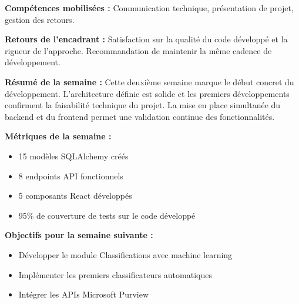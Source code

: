 \textbf{Compétences mobilisées :}
Communication technique, présentation de projet, gestion des retours.

\textbf{Retours de l'encadrant :}
Satisfaction sur la qualité du code développé et la rigueur de l'approche. Recommandation de maintenir la même cadence de développement.

\textbf{Résumé de la semaine :}
Cette deuxième semaine marque le début concret du développement. L'architecture définie est solide et les premiers développements confirment la faisabilité technique du projet. La mise en place simultanée du backend et du frontend permet une validation continue des fonctionnalités.

\textbf{Métriques de la semaine :}
\begin{itemize}
    \item 15 modèles SQLAlchemy créés
    \item 8 endpoints API fonctionnels
    \item 5 composants React développés
    \item 95\% de couverture de tests sur le code développé
\end{itemize}

\textbf{Objectifs pour la semaine suivante :}
\begin{itemize}
    \item Développer le module Classifications avec machine learning
    \item Implémenter les premiers classificateurs automatiques
    \item Intégrer les APIs Microsoft Purview
\end{itemize}